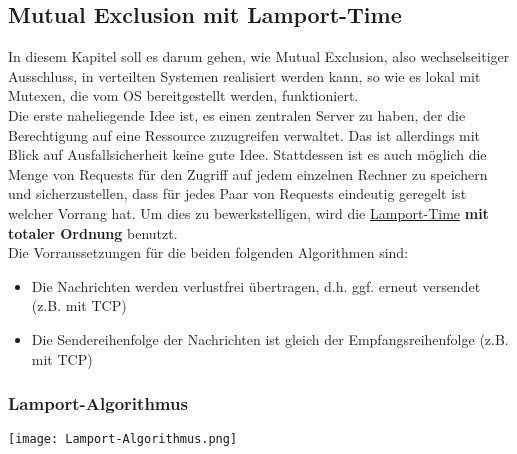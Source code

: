 \subsection{Mutual Exclusion mit Lamport-Time}

In diesem Kapitel soll es darum gehen, wie Mutual Exclusion, also wechselseitiger Ausschluss, in verteilten Systemen realisiert werden kann, so wie es lokal mit Mutexen, die vom OS bereitgestellt werden, funktioniert.\\
Die erste naheliegende Idee ist, es einen zentralen Server zu haben, der die Berechtigung auf eine Ressource zuzugreifen verwaltet. Das ist allerdings mit Blick auf Ausfallsicherheit keine gute Idee. Stattdessen ist es auch möglich die Menge von Requests für den Zugriff auf jedem einzelnen Rechner zu speichern und sicherzustellen, dass für jedes Paar von Requests eindeutig geregelt ist welcher Vorrang hat. Um dies zu bewerkstelligen, wird die \hyperref[sec:lamport-time]{Lamport-Time} \textbf{mit totaler Ordnung} benutzt.\\

Die Vorraussetzungen für die beiden folgenden Algorithmen sind:
\begin{itemize}
    \item Die Nachrichten werden verlustfrei übertragen, d.h. ggf. erneut versendet (z.B. mit TCP)
    \item Die Sendereihenfolge der Nachrichten ist gleich der Empfangsreihenfolge (z.B. mit TCP)
\end{itemize}

\subsubsection{Lamport-Algorithmus}

\texttt{[image: Lamport-Algorithmus.png]}

